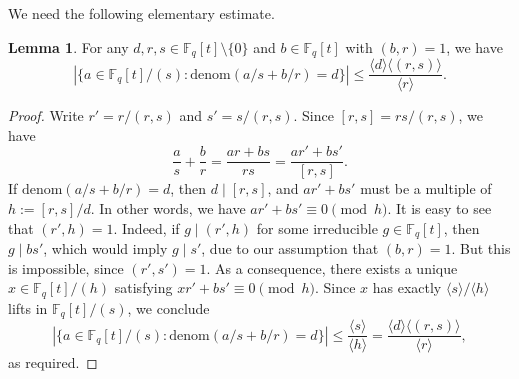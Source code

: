 \documentclass{article}
\theoremstyle{definition}
\newtheorem{lem}{Lemma}[section]
\theoremstyle{definition}
\theoremstyle{remark}
\newcommand{\F}{\mathbb{F}_q[t]}
\newcommand{\1}{\mathbf{1}}
\numberwithin{equation}{section}
\begin{document}
We need the following elementary estimate. 

\begin{lem}\label{denomcount}
For any $d,r,s\in\F\setminus\{0\}$ and $b\in\F$ with $(b,r)=1$, we have
\[|\{a\in \F\slash (s): \text{denom}(a\slash s+b\slash r)=d\}|\leq \frac{\langle d \rangle \langle (r,s)\rangle }{\langle r \rangle}.\]
\end{lem}
\begin{proof}
Write $r'=r/(r,s)$ and $s'=s/(r,s)$. Since $[r,s]=rs/(r,s)$, we have
\[\frac{a}{s}+\frac{b}{r}=\frac{ar+bs}{rs}=\frac{ar'+bs'}{[r,s]}.\]
If $\text{denom}(a\slash s+b\slash r)=d$, then $d\mid [r,s]$, and $ar'+bs'$ must be a multiple of $h:=[r,s]/d$. In other words, we have $ar'+bs'\equiv 0\pmod{h}$. It is easy to see that $(r',h)=1$. Indeed, if $g\mid(r',h)$ for some irreducible $g\in\F$, then $g\mid bs'$, which would imply $g\mid s'$, due to our assumption that $(b,r)=1$. But this is impossible, since $(r',s')=1$. As a consequence, there exists a unique $x\in \F\slash (h)$ satisfying $xr'+bs'\equiv 0\pmod{h}$. Since $x$ has exactly $\langle s \rangle/\langle h \rangle$ lifts in $\F\slash (s)$, we conclude 
\[|\{a\in \F\slash (s): \text{denom}(a\slash s+b\slash r)=d\}|\le \frac{\langle s \rangle}{\langle h \rangle} =\frac{\langle d \rangle \langle (r,s)\rangle }{\langle r \rangle},\]
as required.
\end{proof}
\end{document}

